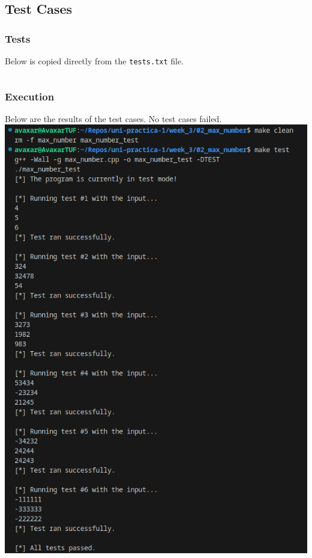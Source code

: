 \documentclass[12pt]{article}
\begin{document}
\subsection{Test Cases}

\subsubsection{Tests}
Below is copied directly from the \texttt{tests.txt} file.
\inputminted{text}{02_max_number/tests.txt}

\subsubsection{Execution}
Below are the results of the test cases. No test cases failed.
\newline\includegraphics[width=\textwidth]{02_max_number_test}
\end{document}
